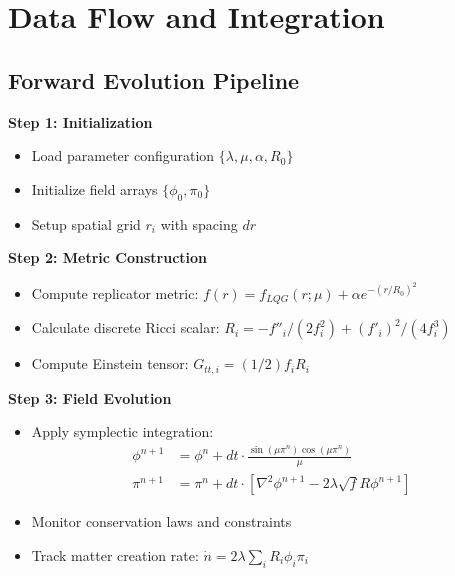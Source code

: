 \documentclass[11pt]{article}
\begin{document}
\begin{center}
\end{center}

\section{Data Flow and Integration}

\subsection{Forward Evolution Pipeline}

\textbf{Step 1: Initialization}
\begin{itemize}
\item Load parameter configuration $\{\lambda, \mu, \alpha, R_0\}$
\item Initialize field arrays $\{\phi_0, \pi_0\}$
\item Setup spatial grid $r_i$ with spacing $dr$
\end{itemize}

\textbf{Step 2: Metric Construction}
\begin{itemize}
\item Compute replicator metric: $f(r) = f_{LQG}(r;\mu) + \alpha e^{-(r/R_0)^2}$
\item Calculate discrete Ricci scalar: $R_i = -f''_i/(2f_i^2) + (f'_i)^2/(4f_i^3)$
\item Compute Einstein tensor: $G_{tt,i} = (1/2)f_i R_i$
\end{itemize}

\textbf{Step 3: Field Evolution}
\begin{itemize}
\item Apply symplectic integration:
  \begin{align}
  \phi^{n+1} &= \phi^n + dt \cdot \frac{\sin(\mu\pi^n)\cos(\mu\pi^n)}{\mu} \\
  \pi^{n+1} &= \pi^n + dt \cdot [\nabla^2\phi^{n+1} - 2\lambda\sqrt{f}R\phi^{n+1}]
  \end{align}
\item Monitor conservation laws and constraints
\item Track matter creation rate: $\dot{n} = 2\lambda \sum_i R_i \phi_i \pi_i$
\end{itemize}
\end{document}
